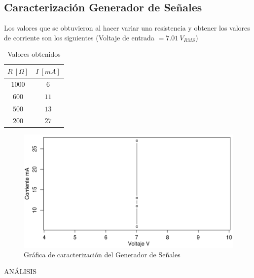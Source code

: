 \documentclass[twocolumn]{IEEEtran}
\begin{document}
\subsection{Caracterización Generador de Señales}
\noindent
Los valores que se obtuvieron al hacer variar una resistencia y obtener los valores de corriente son los siguientes (Voltaje de entrada $= 7.01\ V_{RMS}$)
\begin{table}[H]
	\centering
\begin{tabular}[c]{|c|c|} \hline
$R \ [\Omega]$ & $I\ [mA]$ \\ \hline
$1000$ & $6$ \\ \hline
$600$ & $11$ \\ \hline
$500$ & $13$ \\ \hline
$200$ & $27$ \\ \hline
\end{tabular}
	\caption{Valores obtenidos}
	\label{tab10}
\end{table}
\begin{figure}[H]
	\centering
		\includegraphics[scale=0.2]{reg2.png}
	\caption{Gráfica de caracterización del Generador de Señales}
	\label{fig21}
\end{figure}
\noindent
ANÁLISIS
\end{document}
